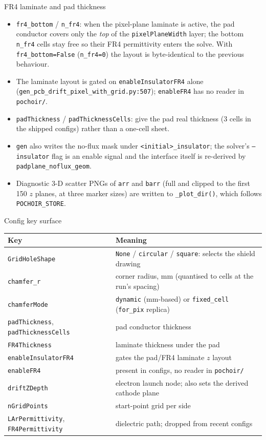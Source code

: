 \documentclass[10pt,aspectratio=169]{beamer}
\newcommand{\ti}[1]{\texttt{\footnotesize #1}}
\begin{document}
\begin{frame}[allowframebreaks]{FR4 laminate and pad thickness}
  \begin{itemize}\small
  \item \ti{fr4\_bottom} / \ti{n\_fr4}: when the pixel-plane laminate is active, the pad
        conductor covers only the \emph{top} of the \ti{pixelPlaneWidth} layer; the bottom
        \ti{n\_fr4} cells stay free so their FR4 permittivity enters the solve. With
        \ti{fr4\_bottom=False} (\ti{n\_fr4=0}) the layout is byte-identical to the previous
        behaviour.
  \item The laminate layout is gated on \ti{enableInsulatorFR4} alone
        (\ti{gen\_pcb\_drift\_pixel\_with\_grid.py:507}); \ti{enableFR4} has no reader in
        \ti{pochoir/}.
  \item \ti{padThickness} / \ti{padThicknessCells}: give the pad real thickness (3 cells in
        the shipped configs) rather than a one-cell sheet.
  \item \ti{gen} also writes the no-flux mask under \ti{<initial>\_insulator}; the solver's
        \ti{--insulator} flag is an enable signal and the interface itself is re-derived by
        \ti{padplane\_noflux\_geom}.
  \item Diagnostic 3-D scatter PNGs of \ti{arr} and \ti{barr} (full and clipped to the first
        150 $z$ planes, at three marker sizes) are written to \ti{\_plot\_dir()}, which
        follows \ti{POCHOIR\_STORE}.
  \end{itemize}
\end{frame}

\begin{frame}[allowframebreaks]{Config key surface}
  \small
  \begin{center}
  \begin{tabular}{ll}
    \toprule
    Key & Meaning \\
    \midrule
    \ti{GridHoleShape} & \ti{None} / \ti{circular} / \ti{square}: selects the shield drawing \\
    \ti{chamfer\_r} & corner radius, mm (quantised to cells at the run's spacing) \\
    \ti{chamferMode} & \ti{dynamic} (mm-based) or \ti{fixed\_cell} (\ti{for\_pix} replica) \\
    \ti{padThickness}, \ti{padThicknessCells} & pad conductor thickness \\
    \ti{FR4Thickness} & laminate thickness under the pad \\
    \ti{enableInsulatorFR4} & gates the pad/FR4 laminate $z$ layout \\
    \ti{enableFR4} & present in configs, no reader in \ti{pochoir/} \\
    \ti{driftZDepth} & electron launch node; also sets the derived cathode plane \\
    \ti{nGridPoints} & start-point grid per side \\
    \ti{LArPermittivity}, \ti{FR4Permittivity} & dielectric path; dropped from recent configs \\
    \bottomrule
  \end{tabular}
  \end{center}
\end{frame}
\end{document}
